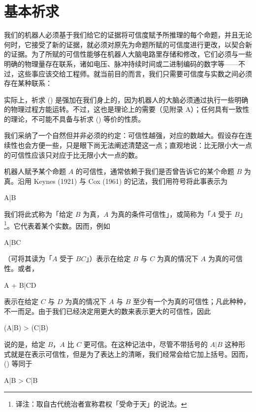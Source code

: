 \section{基本祈求}

我们的机器人必须基于我们给它的证据将可信度赋予所推理的每个命题，并且无论何时，它接受了新的证据，就必须对原先为命题所赋的可信度进行更改，以契合新的证据。为了所赋的可信性能够在机器人大脑电路里存储和修改，它们必须与一些明确的物理量存在联系，诸如电压、脉冲持续时间或二进制编码的数字等——不过，这些事应该交给工程师。就当前目的而言，我们只需要可信度与实数之间必须存在某种联系：

\placeformula[desiderata-1]
\startformula
{}\quad{}
\stopformula

实际上，祈求 () 是强加在我们身上的，因为机器人的大脑必须通过执行一些明确的物理过程方能运转。不过，这也是理论上的需要（见附录 A）；任何具有一致性的理论，不可能不具备与祈求 () 等价的性质。

我们采纳了一个自然但并非必须的约定：可信性越强，对应的数越大。假设存在连续性也会方便一些，只是眼下尚无法阐述清楚这一点；直观地说：比无限小大一点的可信性应该只对应于比无限小大一点的数。

机器人赋予某个命题 $A$ 的可信性，通常依赖于我们是否曾告诉它的某个命题 $B$ 为真。沿用 Keynes (1921) 与 Cox (1961) 的记法，我们用符号将此事表示为

\placeformula
\startformula
A|B
\stopformula

我们将此式称为「给定 $B$ 为真，$A$ 为真的条件可信性」，或简称为「$A$ 受于 $B$」\footnote{译注：取自古代统治者宣称君权「受命于天」的说法。}。它代表着某个实数。因而，例如

\placeformula
\startformula
A|BC
\stopformula

（可将其读为「$A$ 受于 $BC$」）表示在给定 $B$ 与 $C$ 为真的情况下 $A$ 为真的可信性。或者，

\placeformula
\startformula
A + B|CD
\stopformula

表示在给定 $C$ 与 $D$ 为真的情况下 $A$ 与 $B$ 至少有一个为真的可信性；凡此种种，不一而足。由于我们已经决定用更大的数来表示更大的可信性，因此

\placeformula[1-32]
\startformula
(A|B) > (C|B)
\stopformula

说的是，给定 $B$，$A$ 比 $C$ 更可信。在这种记法中，尽管不带括号的 $A|B$ 这种形式就是在表示可信性，但是为了表达上的清晰，我们经常会给它加上括号。因而，(\in[1-32]) 等同于

\placeformula
\startformula
A|B > C|B
\stopformula

